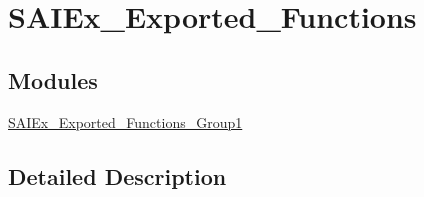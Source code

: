 \hypertarget{group___s_a_i_ex___exported___functions}{}\section{S\+A\+I\+Ex\+\_\+\+Exported\+\_\+\+Functions}
\label{group___s_a_i_ex___exported___functions}
\subsection*{Modules}
\begin{DoxyCompactItemize}
\item 
\hyperlink{group___s_a_i_ex___exported___functions___group1}{S\+A\+I\+Ex\+\_\+\+Exported\+\_\+\+Functions\+\_\+\+Group1}
\end{DoxyCompactItemize}


\subsection{Detailed Description}
